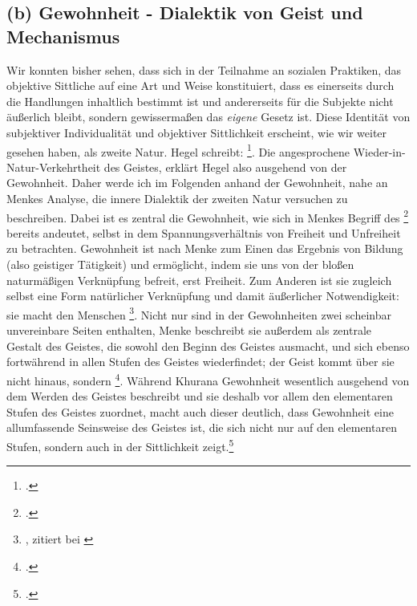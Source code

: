 \documentclass[12pt, a4paper, openany]{report}
\begin{document}
\subsection{(b) Gewohnheit - Dialektik von Geist und Mechanismus}
Wir konnten bisher sehen, dass sich in der Teilnahme an sozialen Praktiken, das objektive Sittliche auf eine Art und Weise konstituiert, dass es einerseits durch die Handlungen inhaltlich bestimmt ist und andererseits für die Subjekte nicht äußerlich bleibt, sondern gewissermaßen das \emph{eigene} Gesetz ist. 
Diese Identität von subjektiver Individualität und objektiver Sittlichkeit erscheint, wie wir weiter gesehen haben, als zweite Natur.
Hegel schreibt: \footcite[][§ 151, S. 166]{hegel_grundlinien_2017}.
Die angesprochene Wieder-in-Natur-Verkehrtheit des Geistes, erklärt Hegel also ausgehend von der Gewohnheit.
Daher werde ich im Folgenden anhand der Gewohnheit, nahe an Menkes Analyse, die innere Dialektik der zweiten Natur versuchen zu beschreiben.
Dabei ist es zentral die Gewohnheit, wie sich in Menkes Begriff des \footcite[][145]{menke_autonomie_2018} bereits andeutet, selbst in dem Spannungsverhältnis von Freiheit und Unfreiheit zu betrachten. 
Gewohnheit ist nach Menke zum Einen das Ergebnis von Bildung (also geistiger Tätigkeit) und ermöglicht, indem sie uns von der bloßen naturmäßigen Verknüpfung befreit, erst Freiheit.
Zum Anderen ist sie zugleich selbst eine Form natürlicher Verknüpfung und damit äußerlicher Notwendigkeit: 
sie macht den Menschen \footnote{, zitiert bei \cite[][127]{menke_autonomie_2018}}.
Nicht nur sind in der Gewohnheiten zwei scheinbar unvereinbare Seiten enthalten, Menke beschreibt sie außerdem als zentrale Gestalt des Geistes, die sowohl den Beginn des Geistes ausmacht, und sich ebenso fortwährend in allen Stufen des Geistes wiederfindet; 
der Geist kommt über sie nicht hinaus, sondern \footcite[][129]{menke_autonomie_2018}.
Während Khurana Gewohnheit wesentlich ausgehend von dem Werden des Geistes beschreibt und sie deshalb vor allem den elementaren Stufen des Geistes zuordnet, macht auch dieser deutlich, dass Gewohnheit eine allumfassende Seinsweise des Geistes ist, die sich nicht nur auf den elementaren Stufen, sondern auch in der Sittlichkeit zeigt.\footcite[Vgl.][433]{khurana_freiheit_2017}
\end{document}
